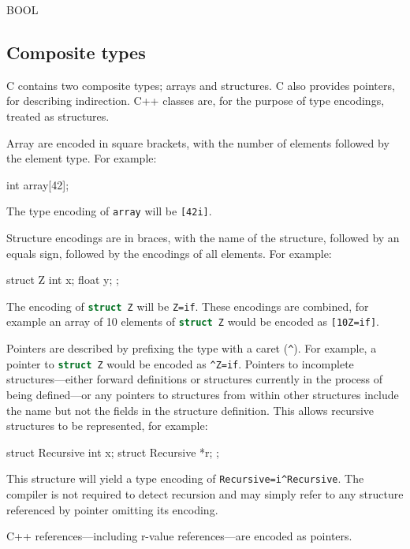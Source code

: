 \documentclass[a4paper]{report}
\newcommand{\ccode}[1]{\lstinline[language={C}]{#1}}
\begin{document}
BOOL

\subsection{Composite types}

C contains two composite types; arrays and structures.
C also provides pointers, for describing indirection.
C++ classes are, for the purpose of type encodings, treated as structures.

Array are encoded in square brackets, with the number of elements followed by the element type.
For example:

\begin{codesnippet}
int array[42];
\end{codesnippet}

The type encoding of \ccode{array} will be \texttt{[42i]}.

Structure encodings are in braces, with the name of the structure, followed by an equals sign, followed by the encodings of all elements.
For example:

\begin{codesnippet}
struct Z
{
	int x;
	float y;
};
\end{codesnippet}

The encoding of \ccode{struct Z} will be \texttt{{Z=if}}.
These encodings are combined, for example an array of 10 elements of \ccode{struct Z} would be encoded as \texttt{[10{Z=if}]}.

Pointers are described by prefixing the type with a caret (\texttt{\^{}}).
For example, a pointer to \ccode{struct Z} would be encoded as \texttt{\^{}{Z=if}}.
Pointers to incomplete structures---either forward definitions or structures currently in the process of being defined---or any pointers to structures from within other structures include the name but not the fields in the structure definition.
This allows recursive structures to be represented, for example:

\begin{codesnippet}
struct Recursive
{
	int x;
	struct Recursive *r;
};
\end{codesnippet}

This structure will yield a type encoding of \texttt{{Recursive=i\^{}{Recursive}}}.
The compiler is not required to detect recursion and may simply refer to any structure referenced by pointer omitting its encoding.

C++ references---including r-value references---are encoded as pointers.
\end{document}
